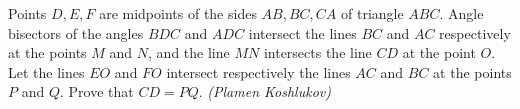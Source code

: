 Points $D,E,F$ are midpoints of the sides $AB,BC,CA$ of triangle $ABC$. Angle bisectors of the angles $BDC$ and $ADC$ intersect the lines $BC$ and $AC$ respectively at the points $M$ and $N$, and the line $MN$ intersects the line $CD$ at the point $O$. Let the lines $EO$ and $FO$ intersect respectively the lines $AC$ and $BC$ at the points $P$ and $Q$. Prove that $CD=PQ$. \textit{(Plamen Koshlukov)}